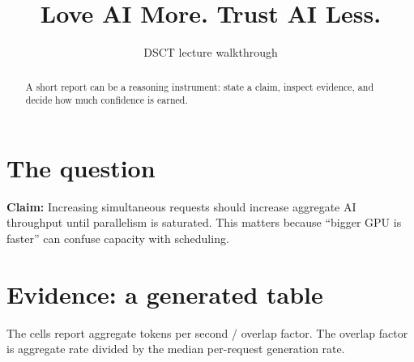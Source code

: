 \documentclass{article}\usepackage[margin=1in]{geometry}\usepackage{booktabs}\usepackage{xcolor}\usepackage{hyperref}
\title{Love AI More. Trust AI Less.}\author{DSCT lecture walkthrough}\date{}
\begin{document}
\maketitle
\begin{abstract}A short report can be a reasoning instrument: state a claim, inspect evidence, and decide how much confidence is earned.\end{abstract}
\section{The question}\textbf{Claim:} Increasing simultaneous requests should increase aggregate AI throughput until parallelism is saturated. This matters because “bigger GPU is faster” can confuse capacity with scheduling.
\section{Evidence: a generated table}The cells report aggregate tokens per second / overlap factor. The overlap factor is aggregate rate divided by the median per-request generation rate.\begin{center}\end{center}
\end{document}
